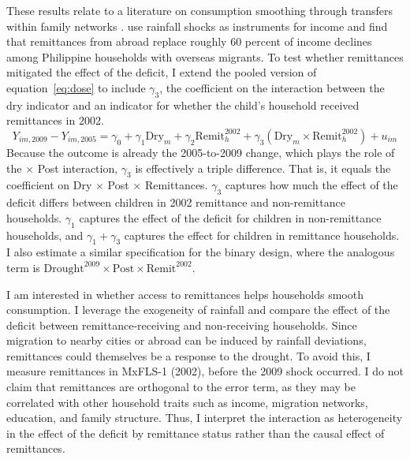 These results relate to a literature on consumption smoothing through transfers within family networks \parencite{rosenzweigRiskImplicitContracts1988,rosenzweigConsumptionSmoothingMigration1989,yangAreRemittancesInsurance2007,yangCopingDisasterImpact2008,yangMigrantRemittances2011}. \textcite{yangAreRemittancesInsurance2007} use rainfall shocks as instruments for income and find that remittances from abroad replace roughly 60 percent of income declines among Philippine households with overseas migrants. To test whether remittances mitigated the effect of the deficit, I extend the pooled version of equation~\eqref{eq:dose} to include $\gamma_3$, the coefficient on the interaction between the dry indicator and an indicator for whether the child's household received remittances in 2002.
\begin{equation}
Y_{im,2009} - Y_{im,2005} = \gamma_0 + \gamma_1 \text{Dry}_m + \gamma_2 \text{Remit}_h^{2002} + \gamma_3 \left(\text{Dry}_m \times \text{Remit}_h^{2002}\right) + u_{im} \label{eq:remit}
\end{equation}
Because the outcome is already the 2005-to-2009 change, which plays the role of the $\times$ Post interaction, $\gamma_3$ is effectively a triple difference. That is, it equals the coefficient on Dry $\times$ Post $\times$ Remittances. $\gamma_3$ captures how much the effect of the deficit differs between children in 2002 remittance and non-remittance households. $\gamma_1$ captures the effect of the deficit for children in non-remittance households, and $\gamma_1 + \gamma_3$ captures the effect for children in remittance households. I also estimate a similar specification for the binary design, where the analogous term is $\text{Drought}^{2009} \times \text{Post} \times \text{Remit}^{2002}$.

I am interested in whether access to remittances helps households smooth consumption. I leverage the exogeneity of rainfall and compare the effect of the deficit between remittance-receiving and non-receiving households. Since migration to nearby cities or abroad can be induced by rainfall deviations, remittances could themselves be a response to the drought. To avoid this, I measure remittances in MxFLS-1 (2002), before the 2009 shock occurred. I do not claim that remittances are orthogonal to the error term, as they may be correlated with other household traits such as income, migration networks, education, and family structure. Thus, I interpret the interaction as heterogeneity in the effect of the deficit by remittance status rather than the causal effect of remittances.

